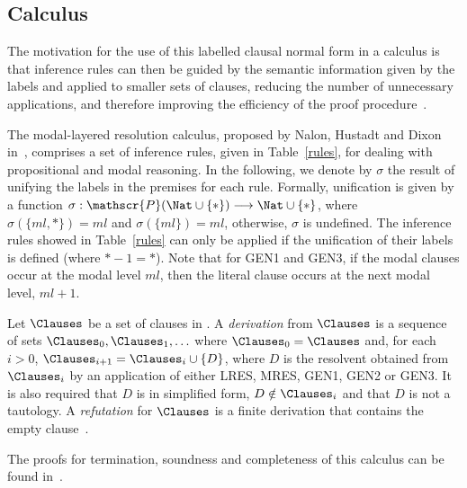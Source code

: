 \begin{example}
    
\end{example}

\subsection{Calculus}

The motivation for the use of this labelled clausal normal form in a calculus is
that inference rules can then be guided by the semantic information given by the
labels and applied to smaller sets of clauses, reducing the number of
unnecessary applications, and therefore improving the efficiency of the proof
procedure~\cite{Nalon2016}. 

The modal-layered resolution calculus, proposed by Nalon, Hustadt and Dixon
in~\cite{nalon2015modal}, comprises a set of inference rules, given in
Table~\ref{rules}, for dealing with propositional and modal reasoning. In the
following, we denote by $\sigma$ the result of unifying the labels in the
premises for each rule.  Formally, unification is given by a function $ \sigma :
\mathscr{P}(\Nat \cup \{*\}) \longrightarrow \Nat \cup \{*\}$, where $\sigma
(\{ml, *\}) = ml$ and $\sigma (\{ml\}) = ml$, otherwise, $\sigma$ is undefined.
The inference rules showed in Table~\ref{rules} can only be applied if the
unification of their labels is defined (where $* - 1 = *$). Note that for GEN1
and GEN3, if the modal clauses occur at the modal level $ml$, then the literal
clause occurs at the next modal level, $ml + 1$.

\begin{definition}
    Let $\Clauses$ be a set of clauses in . A \emph{derivation} from
    $\Clauses$ is a sequence of sets $\Clauses_0, \Clauses_1, \ldots$ where
    $\Clauses_0 = \Clauses$ and, for each $i > 0$, $\Clauses_{i+1} = \Clauses_i
    \cup \{D\}$, where $D$ is the resolvent obtained from $\Clauses_i$ by an
    application of either LRES, MRES, GEN1, GEN2 or GEN3. It is also required
    that $D$ is in simplified form, $D \notin \Clauses_i$ and that $D$ is not a
    tautology. A \emph{refutation} for $\Clauses$ is a finite derivation that
    contains the empty clause~\cite{nalon2015modal}.
\end{definition}

The proofs for termination, soundness and completeness of this calculus can be
found in~\cite{nalon2015modal}.



